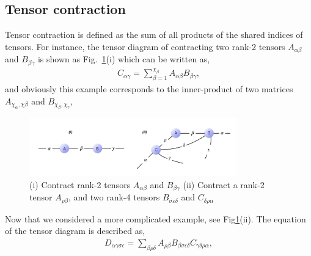 \subsection{Tensor contraction}
Tensor contraction is defined as the sum of all products of the shared indices of tensors. For instance, the tensor diagram of contracting two rank-2 tensors $A_{\alpha \beta}$ and $B_{\beta \gamma}$ is shown as Fig.~\ref{fig222}(i) which can be written as, 
\begin{align}
	C_{\alpha \gamma}=\sum\limits_{\beta = 1}^{\chi_{\beta}}{A_{\alpha \beta}B_{\beta \gamma}},
\end{align}
and obviously this example corresponds to the inner-product of two matrices $A_{\chi_{\alpha}, \chi{\beta}}$ and $B_{\chi_{\beta}, \chi_{\gamma}}$,
\begin{figure}[ht]
	\centering
	\includegraphics[width=0.80\textwidth]{figures/fig222.png}
	\caption[The examples of tensor diagrams.]{(i) Contract rank-2 tensors $A_{\alpha \beta}$ and $B_{\beta \gamma} $ (ii) Contract a rank-2 tensor $A_{\rho \beta}$, and two rank-4 tensors $B_{\sigma \varepsilon \delta}$ and $C_{\delta \rho \alpha}$}
	\label{fig222}
\end{figure}

Now that we considered a more complicated example, see Fig\ref{fig222}(ii). The equation of the tensor diagram is described as,
\begin{align}
	D_{\alpha \gamma \sigma \epsilon}=\sum_{\beta \rho \delta}{A_{\rho \beta}B_{\beta \sigma \epsilon \delta}C_{\gamma \delta \rho \alpha}},
\end{align}

